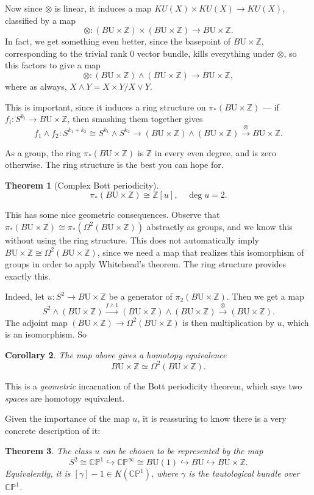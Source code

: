 \documentclass{shortart}
\newtheorem{thm}{Theorem}
\newtheorem{cor}[thm]{Corollary}
\theoremstyle{definition}
\newcommand\BU{B\mathrm{U}}
\newcommand\Z{\mathbb{Z}}
\newcommand\CP{\mathbb{CP}}
\begin{document}
Now since $\otimes$ is linear, it induces a map $KU(X) \times KU(X) \to KU(X)$, classified by a map 
\[
  \otimes: (\BU \times \Z) \times (\BU \times \Z) \to \BU \times \Z.
\]
In fact, we get something even better, since the basepoint of $\BU \times \Z$, corresponding to the trivial rank 0 vector bundle, kills everything under $\otimes$, so this factors to give a map
\[
  \otimes: (\BU \times \Z) \wedge (\BU \times \Z) \to \BU \times \Z,
\]
where as always, $X \wedge Y = X \times Y/X \vee Y$.

This is important, since it induces a ring structure on $\pi_* (\BU \times \Z)$ --- if $f_i: S^{k_i} \to \BU \times \Z$, then smashing them together gives
\[
  f_1 \wedge f_2: S^{k_1 + k_2} \cong S^{k_1} \wedge S^{k_2} \to (\BU \times \Z) \wedge (\BU \times \Z) \overset{\otimes}{\to} \BU \times \Z.
\]

As a group, the ring $\pi_*(\BU \times \Z)$ is $\Z$ in every even degree, and is zero otherwise. The ring structure is the best you can hope for.
\begin{thm}[Complex Bott periodicity]
  \[
    \pi_*(\BU \times \Z) \cong \Z[u],\quad\deg u = 2.
  \]
\end{thm}

This has some nice geometric consequences. Observe that $\pi_*(\BU \times \Z) \cong \pi_*(\Omega^2(\BU \times \Z))$ abstractly as groups, and we know this without using the ring structure. This does not automatically imply $\BU \times \Z \cong \Omega^2(\BU \times \Z)$, since we need a map that realizes this isomorphism of groups in order to apply Whitehead's theorem. The ring structure provides exactly this.

Indeed, let $u: S^2 \to \BU \times \Z$ be a generator of $\pi_2(\BU \times \Z)$. Then we get a map
\[
  S^2 \wedge (\BU \times \Z) \overset{f \wedge 1}\to (\BU \times \Z) \wedge (\BU \times \Z) \overset{\otimes}\to (\BU \times \Z).
\]
The adjoint map $(\BU \times \Z) \to \Omega^2 (\BU \times \Z)$ is then multiplication by $u$, which is an isomorphism. So
\begin{cor}
  The map above gives a homotopy equivalence
  \[
    \BU \times \Z \simeq \Omega^2 (\BU \times \Z).
  \]
\end{cor}
This is a \emph{geometric} incarnation of the Bott periodicity theorem, which says two \emph{spaces} are homotopy equivalent.

Given the importance of the map $u$, it is reassuring to know there is a very concrete description of it:
\begin{thm}
  The class $u$ can be chosen to be represented by the map
  \[
    S^2 \cong \CP^1 \hookrightarrow \CP^\infty \cong \BU(1) \hookrightarrow \BU \hookrightarrow \BU \times \Z.
  \]
  Equivalently, it is $[\gamma] - 1 \in K(\CP^1)$, where $\gamma$ is the tautological bundle over $\CP^1$.
\end{thm}
\end{document}

